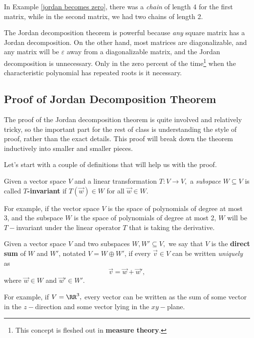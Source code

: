 In Example \ref{jordan becomes zero}, there was a \emph{chain} of length 4 for the first matrix, while in the second matrix, we had two chains of length 2. 

\begin{note}
The Jordan decomposition theorem is powerful because \emph{any} square matrix has a Jordan decomposition. On the other hand, most matrices are diagonalizable, and any matrix will be $\varepsilon$ away from a diagonalizable matrix, and the Jordan decomposition is unnecessary. Only in the zero percent of the time\footnote{This concept is fleshed out in \textbf{measure theory}.} when the characteristic polynomial has repeated roots is it necessary. 

\end{note}

\subsection{Proof of Jordan Decomposition Theorem}
The proof of the Jordan decomposition theorem is quite involved and relatively tricky, so the important part for the rest of class is understanding the style of proof, rather than the exact details. This proof will break down the theorem inductively into smaller and smaller pieces. 

Let's start with a couple of definitions that will help us with the proof. 
\begin{definition}
Given a vector space $V$ and a linear transformation $T: V \rightarrow V,$ a \emph{subspace} $W \subseteq V$ is called \textbf{$T$-invariant} if $T(\vec{w}) \in W$ for all $\vec{w} \in W.$
\end{definition}

For example, if the vector space $V$ is the space of polynomials of degree at most 3, and the subspace $W$ is the space of polynomials of degree at most 2, $W$ will be $T-$invariant under the linear operator $T$ that is taking the derivative.

\begin{definition}
Given a vector space $V$ and two subspaces $W, W' \subseteq V,$ we say that $V$ is the \textbf{direct sum} of $W$ and $W'$, notated $V = W \oplus W'$, if every $\vec{v} \in V$ can be written \emph{uniquely} as 
\[
\vec{v} = \vec{w} + \vec{w}',
\]
where $\vec{w} \in W$ and $\vec{w}' \in W'.$
\end{definition}

For example, if $V = \RR^3,$ every vector can be written as the sum of some vector in the $z-$direction and some vector lying in the $xy-$plane. 

